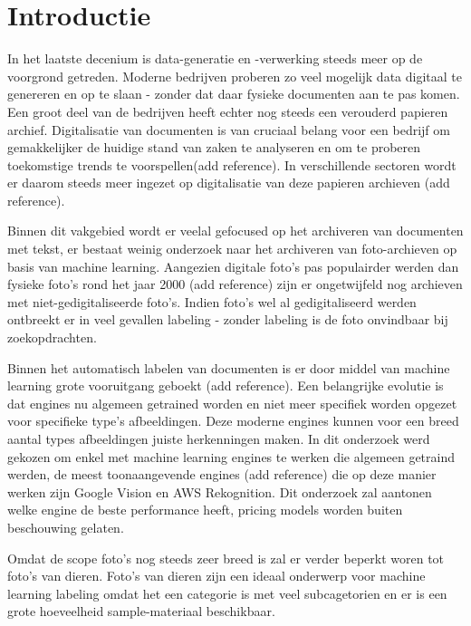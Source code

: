 
\section{Introductie} %
\label{sec:introductie}
In het laatste decenium is data-generatie en -verwerking steeds meer op de voorgrond getreden. Moderne bedrijven proberen zo veel mogelijk data digitaal te genereren en op te slaan - zonder dat daar fysieke documenten aan te pas komen. Een groot deel van de bedrijven heeft echter nog steeds een verouderd papieren archief.
Digitalisatie van documenten is van cruciaal belang voor een bedrijf om gemakkelijker de huidige stand van zaken te analyseren en om te proberen toekomstige trends te voorspellen(add reference). In verschillende sectoren wordt er daarom steeds meer ingezet op digitalisatie van deze papieren archieven (add reference). 

Binnen dit vakgebied wordt er veelal gefocused op het archiveren van documenten met tekst, er bestaat weinig onderzoek naar het archiveren van foto-archieven op basis van machine learning. Aangezien digitale foto's pas populairder werden dan fysieke foto's rond het jaar 2000 (add reference) zijn er ongetwijfeld nog archieven met niet-gedigitaliseerde foto's. Indien foto's wel al gedigitaliseerd werden ontbreekt er in veel gevallen labeling - zonder labeling is de foto onvindbaar bij zoekopdrachten.

Binnen het automatisch labelen van documenten is er door middel van machine learning grote vooruitgang geboekt (add reference). Een belangrijke evolutie is dat engines nu algemeen getrained worden en niet meer specifiek worden opgezet voor specifieke type's afbeeldingen. Deze moderne engines kunnen voor een breed aantal types afbeeldingen juiste herkenningen maken. In dit onderzoek werd gekozen om enkel met machine learning engines te werken die algemeen getraind werden, de meest toonaangevende engines (add reference) die op deze manier werken zijn Google Vision en AWS Rekognition.
Dit onderzoek zal aantonen welke engine de beste performance heeft, pricing models worden buiten beschouwing gelaten.

Omdat de scope foto's nog steeds zeer breed is zal er verder beperkt woren tot foto's van dieren. Foto's van dieren zijn een ideaal onderwerp voor machine learning labeling omdat het een categorie is met veel subcagetorien en er is een grote hoeveelheid sample-materiaal beschikbaar.


